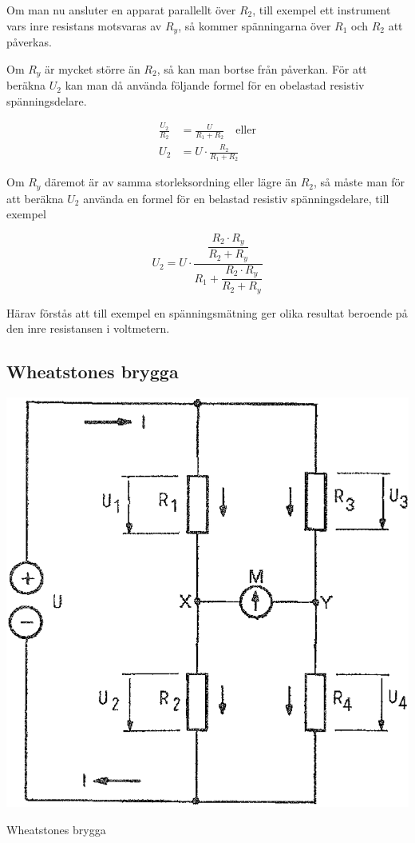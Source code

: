 Om man nu ansluter en apparat parallellt över \(R_2\), till exempel ett instrument
vars inre resistans motsvaras av \(R_y\), så kommer spänningarna över \(R_1\)
och \(R_2\) att påverkas.

Om \(R_y\) är mycket större än \(R_2\), så kan man bortse från påverkan.
För att beräkna \(U_2\) kan man då använda följande formel för en obelastad
resistiv spänningsdelare.

\begin{align*}
\frac{U_2}{R_2} &= \frac{U}{R_1 + R_2} \quad \text{eller} \\
U_2 &= U \cdot \frac{R_2}{R_1 + R_2}
\end{align*}

Om \(R_y\) däremot är av samma storleksordning eller lägre än \(R_2\), så måste
man för att beräkna \(U_2\) använda en formel för en belastad resistiv
spänningsdelare, till exempel

\[
U_2 = U \cdot \dfrac{ \dfrac{R_2 \cdot R_y}{R_2 + R_y} }{ R_1 + \dfrac{R_2 \cdot R_y}{R_2 + R_y} }
\]

Härav förstås att till exempel en spänningsmätning ger olika resultat beroende på den
inre resistansen i voltmetern.

\subsection{Wheatstones brygga}

\begin{marginfigure}%
  \includegraphics[width=\textwidth]{images/cropped_pdfs/bild_2_3-04.pdf}
  \caption{Wheatstones brygga}
  \label{fig:BildII3-04}
\end{marginfigure}

